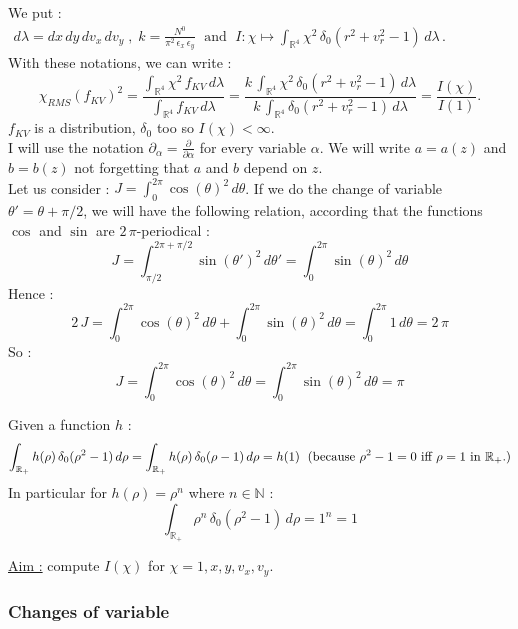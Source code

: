 \documentclass[10pt]{article}
\newcommand{\R}{{\mathbb R}}
\newcommand{\D}{{\partial}}
\begin{document}
We put : \\
$
\begin{array}{l}
d\lambda = dx\,dy\,dv_x\,dv_y \; , \; k = \frac{N^0}{\pi^{2}\,\epsilon_{x}\,\epsilon_{y}} \; \mbox{ and } \;
I:\chi\mapsto\int_{\mathbb{R}^{4}}\chi^{2}\,\delta_{0}\left(r^2+v_r^2-1\right)\,d\lambda \, .
\end{array}
$ \\
With these notations, we can write :
$$
\chi_{RMS}(f_{KV})^2 = \frac{\int_{\R^{4}} \chi^{2}\, f_{KV}\, d\lambda}{\int_{\R^{4}} f_{KV}\, d\lambda} = \frac{k\,\int_{\mathbb{R}^{4}}\chi^{2}\,\delta_{0}\left(r^2+v_r^2-1\right)\,d\lambda}{k\,\int_{\mathbb{R}^{4}}\delta_{0}\left(r^2+v_r^2-1\right)\,d\lambda} = \frac{I(\chi)}{I(1)} .
$$
$f_{KV}$ is a distribution, $\delta_{0}$ too so $I(\chi) < \infty$. \\
I will use the notation $\D_{\alpha} = \frac{\D}{\D \alpha}$ for every variable $\alpha$. We will write $a = a(z)$ and $b = b(z)$ not forgetting that $a$ and $b$ depend on $z$. \\
Let us consider :
$ J = \int_{0}^{2\pi}\cos(\theta)^{2}\,d\theta $. If we do the change of variable $\theta' = \theta+\pi/2$, we will have the following relation, according that the functions $\cos$ and $\sin$ are $2\,\pi$-periodical : \\
$$ J = \int_{\pi/2}^{2\pi+\pi/2}\sin(\theta')^2\,d\theta'= \int_{0}^{2\pi}\sin(\theta)^2\,d\theta$$
Hence :
$$ 2\,J = \int_{0}^{2\pi}\cos(\theta)^2\,d\theta + \int_{0}^{2\pi}\sin(\theta)^2\,d\theta = \int_{0}^{2\pi}1\,d\theta = 2\,\pi $$
So : 
$$ \boxed{J = \int_{0}^{2\pi}\cos(\theta)^2\,d\theta = \int_{0}^{2\pi}\sin(\theta)^2\,d\theta = \pi} $$

Given a function $h$ :
$$
\int_{\mathbb{R}_{+}}h(\rho)\,\delta_{0}(\rho^{2}-1)\,d\rho = \int_{\mathbb{R}_{+}}h(\rho)\,\delta_{0}(\rho-1)\,d\rho = h(1)\; \mbox{      (because } \rho^{2}-1 = 0 \mbox{ iff } \rho = 1 \mbox{ in } \mathbb{R}_{+}.) \\
$$
In particular for $h(\rho) = \rho^{n}$ where $n\in\mathbb{N}$ : 
$$\boxed{\int_{\mathbb{R}_{+}}\rho^{n}\,\delta_{0}(\rho^{2}-1)\,d\rho = 1^n = 1} $$

\underline{Aim :} compute $I(\chi)$ for $\chi = 1, x, y, v_x, v_y$. 


\subsubsection{Changes of variable}
\end{document}
